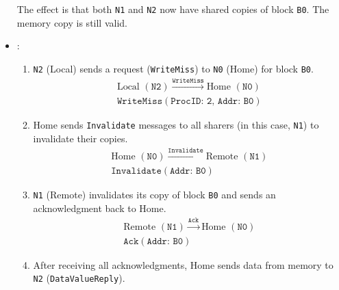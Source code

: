 \begin{itemize}
\begin{figure}[!htp]
    \end{figure}
    The effect is that both \texttt{N1} and \texttt{N2} now have shared copies of block \texttt{B0}. The memory copy is still valid.

    \item {}:
    \begin{enumerate}
        \item \texttt{N2} (Local) sends a request (\texttt{WriteMiss}) to \texttt{N0} (Home) for block \texttt{B0}.
        \begin{gather*}
            \text{Local } (\texttt{N2}) \xrightarrow{\texttt{WriteMiss}} \text{Home } (\texttt{N0})
            \\[.3em]
            \texttt{WriteMiss}(\texttt{ProcID: 2, Addr: B0})
        \end{gather*}
        \item Home sends \texttt{Invalidate} messages to all sharers (in this case, \texttt{N1}) to invalidate their copies.
        \begin{gather*}
            \text{Home } (\texttt{N0}) \xrightarrow{\texttt{Invalidate}} \text{Remote } (\texttt{N1})
            \\[.3em]
            \texttt{Invalidate}(\texttt{Addr: B0})
        \end{gather*}
        \item \texttt{N1} (Remote) invalidates its copy of block \texttt{B0} and sends an acknowledgment back to Home.
        \begin{gather*}
            \text{Remote } (\texttt{N1}) \xrightarrow{\texttt{Ack}} \text{Home } (\texttt{N0})
            \\[.3em]
            \texttt{Ack}(\texttt{Addr: B0})
        \end{gather*}
        \item After receiving all acknowledgments, Home sends data from memory to \texttt{N2} (\texttt{DataValueReply}).
        \begin{gather*}

\end{gather*}
\end{enumerate}
\end{itemize}
